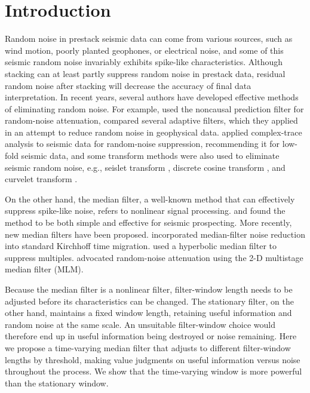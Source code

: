 \section{Introduction}

Random noise in prestack seismic data can come from various sources, such as
wind motion, poorly planted geophones, or electrical noise, and some of this 
seismic random noise invariably exhibits spike-like characteristics. Although 
stacking can at least partly suppress random noise in prestack data, residual 
random noise after stacking will decrease the accuracy of final data interpretation. 
In recent years, several authors have developed effective methods of eliminating 
random noise. For example, \cite{Gulunay00} used the noncausal prediction filter 
for random-noise attenuation, \cite{Ristau01} compared several 
adaptive filters, which they applied in an attempt to reduce random noise in 
geophysical data. \cite{Karsli06}
applied complex-trace analysis to seismic data for random-noise suppression,
recommending it for low-fold seismic data, and some transform methods 
were also used to eliminate seismic random noise, e.g., seislet transform \cite[]{Fomel06,Fomel08},
discrete cosine transform \cite[]{Lu07}, and curvelet transform \cite[]{Neelamani08}.

On the other hand, the median filter, a well-known method that can effectively suppress 
spike-like noise, refers to nonlinear signal processing. 
\cite{Bednar83} and \cite{Duncan95} found the method to be both simple and effective for seismic prospecting. 
More recently, new median filters have been 
proposed. \cite{Mi00} incorporated median-filter noise reduction into 
standard Kirchhoff time migration. \cite{Zhang03} used a hyperbolic 
median filter to suppress multiples. \cite{Liu06} advocated random-noise 
attenuation using the 2-D multistage median filter (MLM).

Because the median filter is a nonlinear filter, filter-window length needs 
to be adjusted before its characteristics can be changed. The stationary filter, 
on the other hand, maintains a fixed window length, retaining useful information and 
random noise at the same scale. An unsuitable filter-window choice would therefore 
end up in useful information being destroyed or noise remaining. Here we propose 
a time-varying median filter that adjusts to different filter-window lengths by 
threshold, making value judgments on useful information versus noise throughout 
the process. We show that the time-varying window is more powerful than the 
stationary window. 


